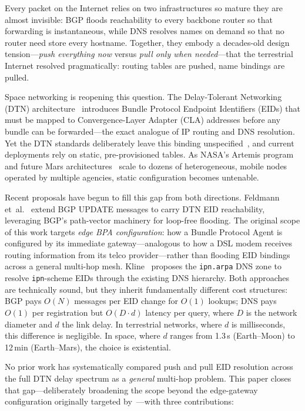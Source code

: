 \documentclass[journal,twocolumn]{IEEEtran}
\begin{document}
Every packet on the Internet relies on two infrastructures so mature they are almost invisible: BGP floods reachability to every backbone router so that forwarding is instantaneous, while DNS resolves names on demand so that no router need store every hostname.
Together, they embody a decades-old design tension---\emph{push everything now} versus \emph{pull only when needed}---that the terrestrial Internet resolved pragmatically: routing tables are pushed, name bindings are pulled.

Space networking is reopening this question.
The Delay-Tolerant Networking (DTN) architecture~\cite{fall2003dtn,rfc9171} introduces Bundle Protocol Endpoint Identifiers (EIDs) that must be mapped to Convergence-Layer Adapter (CLA) addresses before any bundle can be forwarded---the exact analogue of IP routing and DNS resolution.
Yet the DTN standards deliberately leave this binding unspecified~\cite{rfc4838}, and current deployments rely on static, pre-provisioned tables.
As NASA's Artemis program~\cite{israel2020lunanet} and future Mars architectures~\cite{alhilal2019sky} scale to dozens of heterogeneous, mobile nodes operated by multiple agencies, static configuration becomes untenable.

Recent proposals have begun to fill this gap from both directions.
Feldmann et~al.~\cite{feldmann2025bgp} extend BGP UPDATE messages to carry DTN EID reachability, leveraging BGP's path-vector machinery for loop-free flooding.
The original scope of this work targets \emph{edge BPA configuration}: how a Bundle Protocol Agent is configured by its immediate gateway---analogous to how a DSL modem receives routing information from its telco provider---rather than flooding EID bindings across a general multi-hop mesh.
Kline~\cite{kline2025ipnarpa} proposes the \texttt{ipn.arpa} DNS zone to resolve \texttt{ipn}-scheme EIDs through the existing DNS hierarchy.
Both approaches are technically sound, but they inherit fundamentally different cost structures: BGP pays $O(N)$ messages per EID change for $O(1)$ lookups; DNS pays $O(1)$ per registration but $O(D \cdot d)$ latency per query, where $D$ is the network diameter and $d$ the link delay.
In terrestrial networks, where $d$ is milliseconds, this difference is negligible.
In space, where $d$ ranges from 1.3\,s (Earth--Moon) to 12\,min (Earth--Mars), the choice is existential.

No prior work has systematically compared push and pull EID resolution across the full DTN delay spectrum as a \emph{general} multi-hop problem.
This paper closes that gap---deliberately broadening the scope beyond the edge-gateway configuration originally targeted by~\cite{feldmann2025bgp}---with three contributions:
\end{document}
